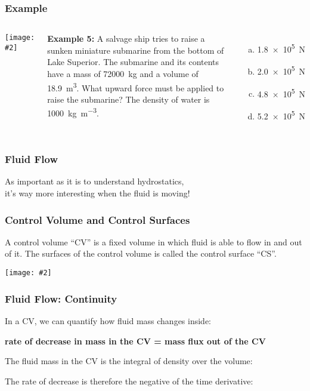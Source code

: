 \documentclass[12pt,aspectratio=169]{beamer}
\newcommand{\pic}[2]{\texttt{[image: \#2]}}
\newcommand{\eq}[2]{\vspace{#1}{\Large\begin{displaymath}#2\end{displaymath}}}
\begin{document}
\begin{frame}
  \frametitle{Example}

  \begin{columns}
    \pic{1}{hpa_b.jpg}

    \textbf{Example 5:} A salvage ship tries to raise a sunken miniature
    submarine from the bottom of Lake Superior. The submarine and its contents
    have a mass of \SI{72000}{\kilo\gram} and a volume of \SI{18.9}{\metre^3}.
    What upward force must be applied to raise the submarine? The density of
    water is \SI{1000}{\kilo\gram\per\metre^3}.
    \begin{enumerate}[(a)]
    \item\SI{1.8e5}{\newton}
    \item\SI{2.0e5}{\newton}
    \item\SI{4.8e5}{\newton}
    \item\SI{5.2e5}{\newton}
    \end{enumerate}
  \end{columns}
\end{frame}



\begin{frame}
  \frametitle{Fluid Flow}

  \begin{center}
    As important as it is to understand hydrostatics,\\
    it's way more interesting when the fluid is moving!
  \end{center}
\end{frame}


\begin{frame}
  \frametitle{Control Volume and Control Surfaces}
  A control volume ``CV'' is a fixed volume in which fluid is able to flow in
  and out of it. The surfaces of the control volume is called the control
  surface ``CS''.
  \begin{center}
    \pic{.5}{CV-CS.jpg}
  \end{center}
\end{frame}

\begin{frame}
  \frametitle{Fluid Flow: Continuity}
  In a CV, we can quantify how fluid mass changes inside:
  \begin{center}
    \textbf{rate of decrease in mass in the CV = mass flux out of the CV}
  \end{center}

  The fluid mass in the CV is the integral of density over the volume:

  \eq{-.2in}{ \int_{CV}\rho dV }
  
  The rate of decrease is therefore the negative of the time derivative:
  
  \eq{-.25in}{
    -\frac{\partial}{\partial t}\int_{CV}\rho dV
  }
\end{frame}
\end{document}

